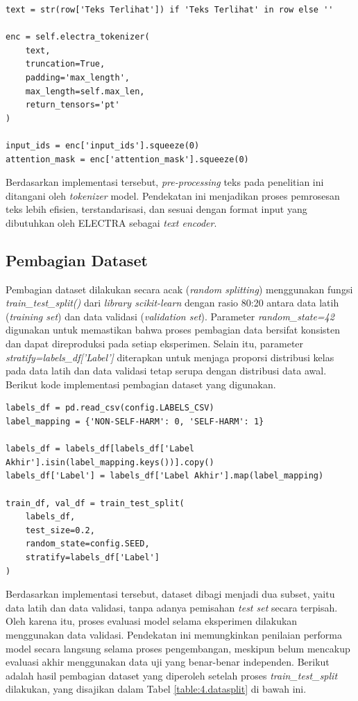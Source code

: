 \begin{lstlisting}[caption={Kode \textit{pre-processing} teks}, label={code:4.preprocessing_teks}]
text = str(row['Teks Terlihat']) if 'Teks Terlihat' in row else ''

enc = self.electra_tokenizer(
    text,
    truncation=True,
    padding='max_length',
    max_length=self.max_len,
    return_tensors='pt'
)

input_ids = enc['input_ids'].squeeze(0)
attention_mask = enc['attention_mask'].squeeze(0)
\end{lstlisting}

Berdasarkan implementasi tersebut, \textit{pre-processing} teks pada penelitian ini ditangani oleh \textit{tokenizer} model. Pendekatan ini menjadikan proses pemrosesan teks lebih efisien, terstandarisasi, dan sesuai dengan format input yang dibutuhkan oleh ELECTRA sebagai \textit{text encoder}.

\subsection{Pembagian Dataset} \label{IV.Preprocessing.Split}
Pembagian dataset dilakukan secara acak (\textit{random splitting}) menggunakan fungsi \textit{train\_test\_split()} dari  \textit{library scikit-learn} dengan rasio 80:20 antara data latih (\textit{training set}) dan data validasi (\textit{validation set}). Parameter \textit{random\_state=42} digunakan untuk memastikan bahwa proses pembagian data bersifat konsisten dan dapat direproduksi pada setiap eksperimen. Selain itu, parameter \textit{stratify=labels\_df['Label']} diterapkan untuk menjaga proporsi distribusi kelas pada data latih dan data validasi tetap serupa dengan distribusi data awal. Berikut kode implementasi pembagian dataset yang digunakan.

\begin{lstlisting}[caption={Kode pembagian dataset}, label={code:4.pembagian_dataset}]
labels_df = pd.read_csv(config.LABELS_CSV)
label_mapping = {'NON-SELF-HARM': 0, 'SELF-HARM': 1}

labels_df = labels_df[labels_df['Label Akhir'].isin(label_mapping.keys())].copy()
labels_df['Label'] = labels_df['Label Akhir'].map(label_mapping)

train_df, val_df = train_test_split(
    labels_df,
    test_size=0.2,
    random_state=config.SEED,
    stratify=labels_df['Label']
)
\end{lstlisting}

Berdasarkan implementasi tersebut, dataset dibagi menjadi dua subset, yaitu data latih dan data validasi, tanpa adanya pemisahan \textit{test set} secara terpisah. Oleh karena itu, proses evaluasi model selama eksperimen dilakukan menggunakan data validasi. Pendekatan ini memungkinkan penilaian performa model secara langsung selama proses pengembangan, meskipun belum mencakup evaluasi akhir menggunakan data uji yang benar-benar independen. Berikut adalah hasil pembagian dataset yang diperoleh setelah proses \textit{train\_test\_split} dilakukan, yang disajikan dalam Tabel \ref{table:4.datasplit} di bawah ini.

